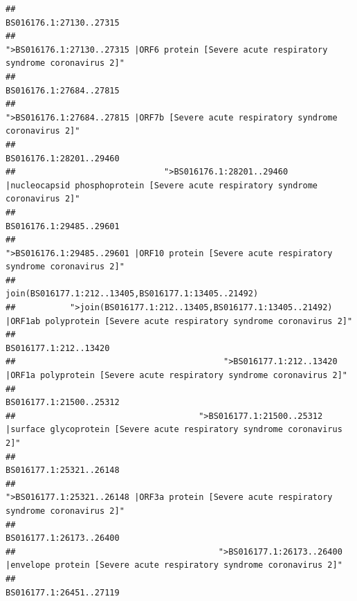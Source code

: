 \documentclass[
]{article}
\begin{document}
\begin{verbatim}
##                                                                                                                BS016176.1:27130..27315 
##                                             ">BS016176.1:27130..27315 |ORF6 protein [Severe acute respiratory syndrome coronavirus 2]" 
##                                                                                                                BS016176.1:27684..27815 
##                                                    ">BS016176.1:27684..27815 |ORF7b [Severe acute respiratory syndrome coronavirus 2]" 
##                                                                                                                BS016176.1:28201..29460 
##                              ">BS016176.1:28201..29460 |nucleocapsid phosphoprotein [Severe acute respiratory syndrome coronavirus 2]" 
##                                                                                                                BS016176.1:29485..29601 
##                                            ">BS016176.1:29485..29601 |ORF10 protein [Severe acute respiratory syndrome coronavirus 2]" 
##                                                                                    join(BS016177.1:212..13405,BS016177.1:13405..21492) 
##           ">join(BS016177.1:212..13405,BS016177.1:13405..21492) |ORF1ab polyprotein [Severe acute respiratory syndrome coronavirus 2]" 
##                                                                                                                  BS016177.1:212..13420 
##                                          ">BS016177.1:212..13420 |ORF1a polyprotein [Severe acute respiratory syndrome coronavirus 2]" 
##                                                                                                                BS016177.1:21500..25312 
##                                     ">BS016177.1:21500..25312 |surface glycoprotein [Severe acute respiratory syndrome coronavirus 2]" 
##                                                                                                                BS016177.1:25321..26148 
##                                            ">BS016177.1:25321..26148 |ORF3a protein [Severe acute respiratory syndrome coronavirus 2]" 
##                                                                                                                BS016177.1:26173..26400 
##                                         ">BS016177.1:26173..26400 |envelope protein [Severe acute respiratory syndrome coronavirus 2]" 
##                                                                                                                BS016177.1:26451..27119 

\end{verbatim}
\end{document}
